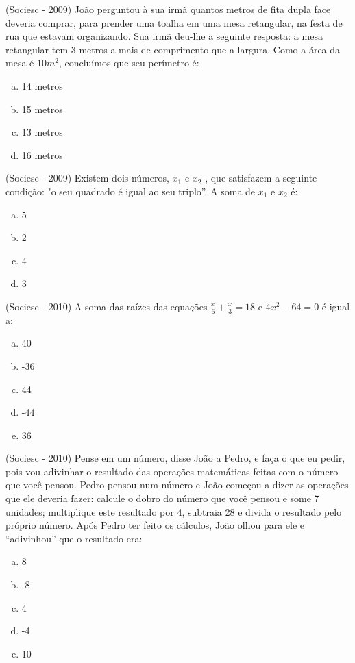  \begin{exer}
 (Sociesc - 2009) João perguntou à sua irmã quantos metros de fita dupla face deveria comprar, para prender uma toalha em uma mesa retangular, na festa de rua que estavam organizando. Sua irmã deu-lhe a seguinte resposta: a mesa retangular tem 3 metros a mais de comprimento que a largura. Como a área da mesa é $10 m^2$, concluímos que seu perímetro é:
  \begin{enumerate}[a)]
  \item 14 metros
  \item 15 metros
  \item 13 metros
  \item 16 metros
 \end{enumerate}
 \end{exer}

 \begin{exer}
 (Sociesc - 2009) Existem dois números, $x_1$ e $x_2$ , que satisfazem a seguinte condição: "o seu quadrado é igual ao seu triplo”. A soma de $x_1$ e $x_2$ é:
  \begin{enumerate}[a)]
  \item 5
  \item 2
  \item 4
  \item 3
 \end{enumerate}
 \end{exer}

 \begin{exer}
 (Sociesc - 2010) A soma das raízes das equações $\frac{x}{6}+\frac{x}{3}=18$ e $4x^2-64=0$ é igual a:
  \begin{enumerate}[a)]
  \item 40
  \item -36
  \item 44
  \item -44
  \item 36
 \end{enumerate}
 \end{exer}

 \begin{exer}
  (Sociesc - 2010) Pense em um número, disse João a Pedro, e faça o que eu pedir, pois vou adivinhar o resultado das operações matemáticas feitas com o número que você pensou. Pedro pensou num número e João começou a dizer as operações que ele deveria fazer: calcule o dobro do número que você pensou e some 7 unidades; multiplique este resultado por 4, subtraia 28 e divida o resultado pelo próprio número. Após Pedro ter feito os cálculos, João olhou para ele e “adivinhou” que o resultado era:
  \begin{enumerate}[a)]
  \item 8
  \item -8
  \item 4
  \item -4
  \item 10
 \end{enumerate}
 \end{exer}

